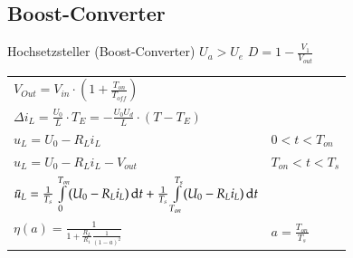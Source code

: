 \subsection{Boost-Converter}
\begin{minipage}{0.75\linewidth}
    Hochsetzsteller (Boost-Converter) $U_a > U_e  $\newline
    $ D=1-\frac{V_1}{V_{out}} $\newline
    \renewcommand{\arraystretch}{2}
    \begin{tabular}{p{9cm} p{3cm}}
        $ V_{Out}=V_{in}\cdot \left(1+\frac{T_{on}}{T_{off}} \right)$&
        \\
        $ \varDelta i_L = \frac{U_0}{L}\cdot T_E=-\frac{U_0  U_d}{L}\cdot(T-T_E)$&\\
        
        $ u_L = U_0 - R_L i_L$&
        $ 0<t<T_{on} $\\
        
        $ u_L = U_0 - R_L i_L -V_{out}$&
        $T_{on}<t<T_{s} $\\
        
        $ \bar{u}_L=\frac{1}{T_s}\int\limits_{0}^{T_{on}}(U_0 - R_L i_L)\mathop{}\!\mathrm{d} t + \frac{1}{T_s}\int\limits_{T_{on}}^{T_s}(U_0 - R_L i_L)\mathop{}\!\mathrm{d} t $&
        \\
        
        $ \eta(a) = \frac{1}{1+\frac{R_L}{R_1}\frac{1}{(1-a)^2}} $ &
        $ a=\frac{T_{on}}{T_s} $\\
                     
    \end{tabular}
    \renewcommand{\arraystretch}{1}
\end{minipage}
